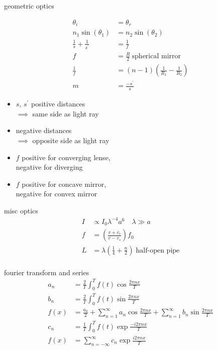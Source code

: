 \documentclass[avery5388, frame]{flashcards}
\begin{document}
\begin{flashcard}{geometric optics}
  {
    \setlength{\columnsep}{-1cm}
    \begin{multicols}{2}
    \begin{align*}
      \theta_{i} &= \theta_{r}\\
      n_{1} \sin(\theta_{1}) &= n_{2} \sin(\theta_{2})\\
      \frac{1}{s} + \frac{1}{s^{'}} &= \frac{1}{f}\\
      f &= \frac{R}{2} \ \textrm{spherical mirror}\\
      \frac{1}{f} &= (n - 1) (\frac{1}{R_{1}} - \frac{1}{R_{2}})\\
      m &= \frac{- s^{'}}{s}
    \end{align*}
    
    \begin{itemize}
    \item $s$, $s^{'}$ positive distances\\
      $\implies$ same side as light ray
    \item negative distances\\
      $\implies$ opposite side as light ray
    \item $f$ positive for converging lense,\\
      negative for diverging
    \item $f$ positive for concave mirror,\\
      negative for convex mirror
    \end{itemize}
    \end{multicols}
  }
\end{flashcard}

\begin{flashcard}{misc optics}
  {
    \begin{align*}
      I &\propto I_{0} \lambda^{-4}a^{6} \quad \lambda \gg a\\
      f &= (\frac{v + v_{r}}{v - v_{s}}) f_{0}\\
      L &= \lambda(\frac{1}{4} + \frac{n}{2}) \; \textrm{half-open pipe}\\
    \end{align*}
  }
\end{flashcard}

\begin{flashcard}{fourier transform and series}
  {
    \begin{align*}
      a_{n} &= \frac{2}{T} \int_{0}^{T} f(t) \cos{\frac{2 \pi n x}{T}}\\
      b_{n} &= \frac{2}{T} \int_{0}^{T} f(t) \sin{\frac{2 \pi n x}{T}}\\
      f(x) &= \frac{a_{0}}{2} + \sum_{n = 1}^{\infty} a_{n} \cos{\frac{2 \pi n x}{T}} + \sum_{n = 1}^{\infty} b_{n} \sin{\frac{2 \pi n x}{T}}\\
      c_{n} &= \frac{1}{T} \int_{0}^{T} f(t) \exp{\frac{-i 2 \pi n x}{T}}\\
      f(x) &= \sum_{n = -\infty}^{\infty} c_{n} \exp{\frac{i 2 \pi n x}{T}}\\
    \end{align*}
  }
\end{flashcard}
\end{document}
